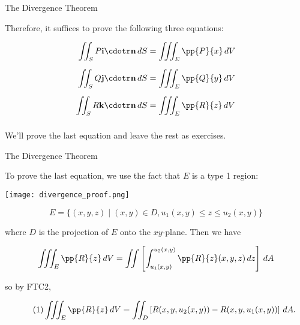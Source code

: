 \documentclass[11pt,english,
handout
]{beamer}
\begin{document}
\begin{frame}[t]{The Divergence Theorem}
\small
\begin{proofs}
Therefore, it suffices to prove the following three equations:

\begin{align*}
\iint_SP\mathbf{i}\cdotr\mathbf{n}\,dS&=\iiint_E\pp{P}{x}\,dV\\[2mm]
\iint_SQ\mathbf{j}\cdotr\mathbf{n}\,dS&=\iiint_E\pp{Q}{y}\,dV\\[2mm]
\iint_SR\mathbf{k}\cdotr\mathbf{n}\,dS&=\iiint_E\pp{R}{z}\,dV\\[2mm]
\end{align*}\pause 

We'll prove the last equation and leave the rest as exercises. 
\end{proofs}
\end{frame}






\begin{frame}[t]{The Divergence Theorem}
\small
\begin{proofs}

To prove the last equation, we use the fact that $E$ is a type 1 region:

\lspace
\begin{minipage}{0.4\textwidth}
\centering
\texttt{[image: divergence\_proof.png]}
\end{minipage}%
\begin{minipage}{0.6\textwidth}
\footnotesize
\[
E=\{(x,y,z)\mid (x,y)\in D,u_1(x,y)\leq z\leq u_2(x,y)\}
\]

where $D$ is the projection of $E$ onto the $xy$-plane. \pause Then we have

\[
\iiint_E\pp{R}{z}\,dV=\iint\left[\int_{u_1(x,y)}^{u_2(x,y)}\pp{R}{z}(x,y,z)\,dz\right]\,dA
\]

so by FTC2,
\end{minipage}

\lspace
{\footnotesize
\begin{equation}\tag{1}
\iiint_E\pp{R}{z}\,dV=\iint_D\left[R(x,y,u_2(x,y))-R(x,y,u_1(x,y))\right]\,dA.
\end{equation}}
\end{proofs}
\end{frame}
\end{document}
